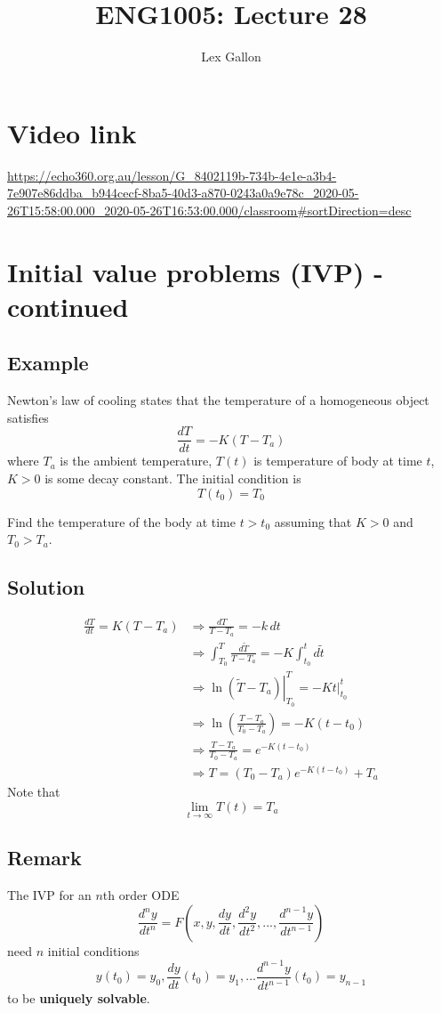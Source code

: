 \documentclass[11pt]{article}
\begin{document}
\title{ENG1005: Lecture 28}
\author{Lex Gallon}
\maketitle

\tableofcontents

\section*{Video link}
\url{https://echo360.org.au/lesson/G_8402119b-734b-4e1e-a3b4-7e907e86ddba_b944cecf-8ba5-40d3-a870-0243a0a9e78c_2020-05-26T15:58:00.000_2020-05-26T16:53:00.000/classroom#sortDirection=desc}

\section{Initial value problems (IVP) - continued}
\subsection{Example}
Newton's law of cooling states that the temperature of a homogeneous object satisfies
\[ \frac{dT}{dt} = -K(T - T_a) \]
where $T_a$ is the ambient temperature, $T(t)$ is temperature of body at time $t$, $K > 0$ is some decay constant. The initial condition is
\[ T(t_0) = T_0 \]

Find the temperature of the body at time $t > t_0$ assuming that $K > 0$ and $T_0 > T_a$.

\subsection{Solution}
\begin{align*}
\frac{dT}{dt} = K(T - T_a) &\Rightarrow \frac{dT}{T - T_a} = -k\, dt \\
&\Rightarrow \int_{T_0}^T \frac{d\tilde{T}}{T-T_a} = -K \int_{t_0}^{t} d\tilde{t} \\
&\Rightarrow \left. \ln(\tilde{T} - T_a) \right|_{T_0}^T = -K t|_{t_0}^t \\
&\Rightarrow \ln\left( \frac{T-T_a}{T_0 - T_a} \right) = -K(t - t_0) \\
&\Rightarrow \frac{T-T_a}{T_0 - T_a} = e^{-K(t - t_0)} \\
&\Rightarrow T = (T_0 - T_a) e^{-K(t - t_0)} + T_a
\end{align*}
Note that 
\[ \lim_{t \rightarrow \infty} T(t) = T_a \]

\subsection{Remark}
The IVP for an $n$th order ODE
\[ \frac{d^ny}{dt^n} = F \left( x, y, \frac{dy}{dt}, \frac{d^2y}{dt^2}, ..., \frac{d^{n-1}y}{dt^{n-1}} \right) \]
need $n$ initial conditions
\[ y(t_0) = y_0, \frac{dy}{dt}(t_0)=y_1, ... \frac{d^{n-1}y}{dt^{n-1}}(t_0) = y_{n-1} \]
to be \textbf{uniquely solvable}.
\end{document}
